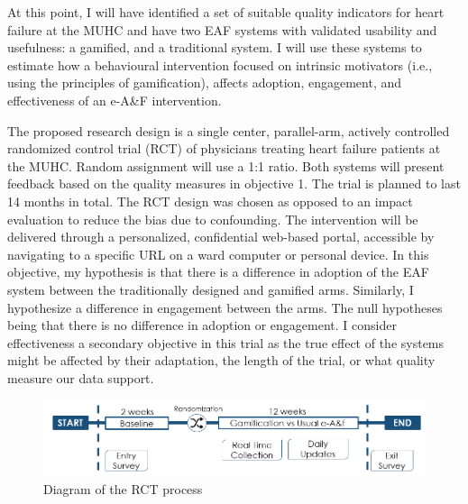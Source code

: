 At this point, I will have identified a set of suitable quality indicators for heart failure at the MUHC and have two \gls{EAF} systems with validated usability and usefulness: a gamified, and a traditional system. I will use these systems to estimate how a behavioural intervention focused on intrinsic motivators (i.e., using the principles of gamification), affects adoption, engagement, and effectiveness of an e-A\&F intervention.

The proposed research design is a single center, parallel-arm, actively controlled randomized control trial (\gls{RCT}) of physicians treating heart failure patients at the \gls{MUHC}. Random assignment will use a 1:1 ratio. Both systems will present feedback based on the quality measures in objective 1. The trial is planned to last 14 months in total. The RCT design was chosen as opposed to an impact evaluation to reduce the bias due to confounding. The intervention will be delivered through a personalized, confidential web-based portal, accessible by navigating to a specific URL on a ward computer or personal device. In this objective, my hypothesis is that there is a difference in adoption of the \gls{EAF} system between the traditionally designed and gamified arms. Similarly, I hypothesize a difference in engagement between the arms. The null hypotheses being that there is no difference in adoption or engagement. I consider effectiveness a secondary objective in this trial as the true effect of the systems might be affected by their adaptation, the length of the trial, or what quality measure our data support.

\begin{figure}[h]
    \vspace{-2mm}
    \centering
    \includegraphics[width=\textwidth]{img/rct_flow.png}
    \caption{Diagram of the RCT process}
    \label{fig:rct_flow}
    \vspace{-5mm}
\end{figure}

